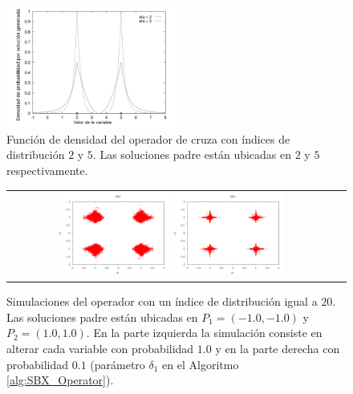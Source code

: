 \begin{figure}[!t]
\centering
\includegraphics[width=0.5\textwidth]{img/Operadores/DensitySBX.png} 
\caption{Función de densidad del operador de cruza \SBX{} con índices de distribución $2$ y $5$. Las soluciones padre están ubicadas en $2$ y $5$ respectivamente.}
\label{fig:fig_sim}
\end{figure}

\begin{figure}[!t]
\centering
\begin{tabular}{cc}
   \includegraphics[width=0.35\textwidth]{img/Operadores/SBX_eta_20_2D_pv_1.png} 
   \includegraphics[width=0.35\textwidth]{img/Operadores/SBX_eta_20_2D_pv_01.png} 
\end{tabular}
\caption{Simulaciones del operador \SBX{} con un índice de distribución igual a $20$. Las soluciones padre están ubicadas en $P_1=(-1.0, -1.0)$ y $P_2=(1.0, 1.0)$. En la parte izquierda la simulación consiste en alterar cada variable con probabilidad $1.0$ y en la parte derecha con probabilidad $0.1$ (parámetro $\delta_1$ en el Algoritmo \ref{alg:SBX_Operator}).}
\label{fig:Simulation_pv}
\end{figure}



